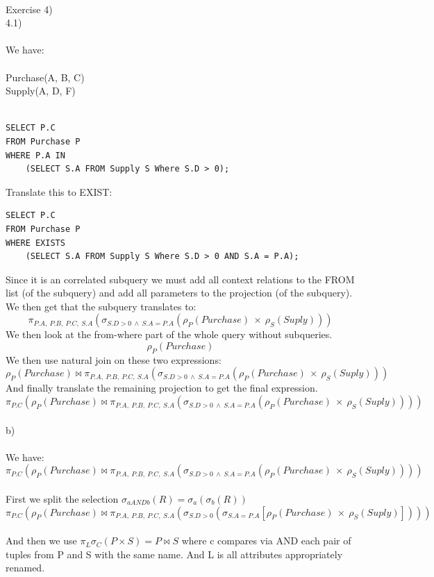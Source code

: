 \documentclass[12pt, letterpaper, twoside]{article}
\begin{document}
\\
Exercise 4)\\
4.1)\\
\\
We have:\\
\\
Purchase(A, B, C)\\
Supply(A, D, F)\\
\\
\begin{verbatim}
SELECT P.C
FROM Purchase P
WHERE P.A IN
    (SELECT S.A FROM Supply S Where S.D > 0);
\end{verbatim}
Translate this to EXIST:
\begin{verbatim}
SELECT P.C
FROM Purchase P
WHERE EXISTS
    (SELECT S.A FROM Supply S Where S.D > 0 AND S.A = P.A);
\end{verbatim}
Since it is an correlated subquery we must add all context relations to the FROM list (of the subquery) and add all parameters to the projection (of the subquery).\\
We then get that the subquery translates to:\\
$$
\pi_{P.A,\ P.B,\ P.C,\ S.A}(\sigma_{S.D > 0\ \wedge\ S.A = P.A}(\rho_P(Purchase)\ \times\ \rho_S(Suply)))
$$   
We then look at the from-where part of the whole query without subqueries.
$$
\rho_P(Purchase)
$$
We then use natural join on these two expressions:
$$
\rho_P(Purchase) \bowtie
\pi_{P.A,\ P.B,\ P.C,\ S.A}(\sigma_{S.D > 0\ \wedge\ S.A = P.A}(\rho_P(Purchase)\ \times\ \rho_S(Suply)))
$$
And finally translate the remaining projection to get the final expression.
$$
\pi_{P.C}(\rho_P(Purchase) \bowtie
\pi_{P.A,\ P.B,\ P.C,\ S.A}(\sigma_{S.D > 0\ \wedge\ S.A = P.A}(\rho_P(Purchase)\ \times\ \rho_S(Suply))))
$$
\\
b)\\
\\
We have:\\
$$
\pi_{P.C}(\rho_P(Purchase) \bowtie
\pi_{P.A,\ P.B,\ P.C,\ S.A}(\sigma_{S.D > 0\ \wedge\ S.A = P.A}(\rho_P(Purchase)\ \times\ \rho_S(Suply))))
$$
\\
First we split the selection $\sigma_{a AND b}(R) = \sigma_a(\sigma_b(R))$\\
$$
\pi_{P.C}(\rho_P(Purchase) \bowtie
\pi_{P.A,\ P.B,\ P.C,\ S.A}(\sigma_{S.D > 0}(\sigma_{S.A = P.A}[\rho_P(Purchase)\ \times\ \rho_S(Suply)])))
$$
\\
And then we use $\pi_L\sigma_C(P \times S) = P \bowtie S$ where c compares via AND each pair of tuples from P and S with the same name. And L is all attributes appropriately renamed.\\
\end{document}

